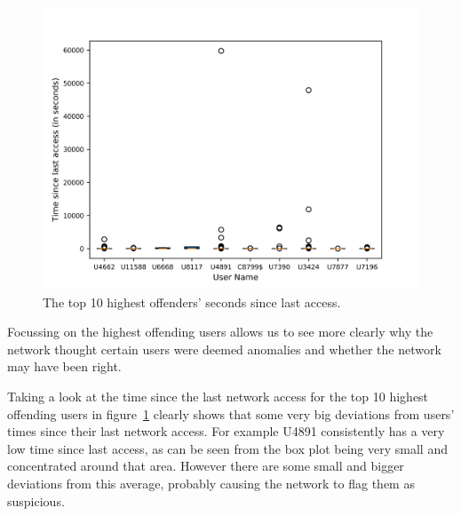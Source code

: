 \begin{figure}
	\begin{center}
		\includegraphics[scale=0.1]{evaluation/highest_offender_time_since_last_access}
	\end{center}
	\caption{The top 10 highest offenders' seconds since last access.~\label{fig:time_since_last_access}}
\end{figure}

Focussing on the highest offending users allows us to see more clearly why the network thought certain users were deemed anomalies and whether the network may have been right.

Taking a look at the time since the last network access for the top 10 highest offending users in figure~\ref{fig:time_since_last_access} clearly shows that some very big deviations from users' times since their last network access. For example U4891 consistently has a very low time since last access, as can be seen from the box plot being very small and concentrated around that area. However there are some small and bigger deviations from this average, probably causing the network to flag them as suspicious.

